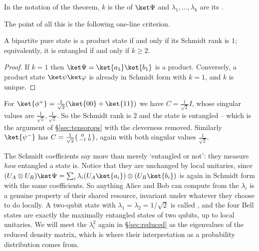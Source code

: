 \begin{definition}
	In the notation of the theorem, $k$ is the  of $\ket\Psi$ and $\lambda_1,\dots,\lambda_k$ are its .
\end{definition}

The point of all this is the following one-line criterion.

\begin{corollary}
	A bipartite pure state is a product state if and only if its Schmidt rank is $1$; equivalently, it is entangled if and only if $k\geq2$.
\end{corollary}

\begin{proof}
	If $k=1$ then $\ket\Psi = \ket{a_1}\ket{b_1}$ is a product. Conversely, a product state $\ket\psi\ket\varphi$ is already in Schmidt form with $k = 1$, and $k$ is unique.
\end{proof}

\begin{example}
	For $\ket{\phi^+} = \tfrac1{\sqrt2}(\ket{00}+\ket{11})$ we have $C = \tfrac1{\sqrt2}I$, whose singular values are $\tfrac1{\sqrt2},\tfrac1{\sqrt2}$. So the Schmidt rank is $2$ and the state is entangled -- which is the argument of \S\ref{sec:tensorops} with the cleverness removed. Similarly $\ket{\psi^-}$ has $C = \tfrac1{\sqrt2}\begin{psmallmatrix}0&1\\-1&0\end{psmallmatrix}$, again with both singular values $\tfrac1{\sqrt2}$.
\end{example}

The Schmidt coefficients say more than merely `entangled or not': they measure \emph{how} entangled a state is. Notice that they are unchanged by local unitaries, since $(U_A\otimes U_B)\ket\Psi = \sum_i\lambda_i(U_A\ket{a_i})\otimes(U_B\ket{b_i})$ is again in Schmidt form with the same coefficients. So anything Alice and Bob can compute from the $\lambda_i$ is a genuine property of their shared resource, invariant under whatever they choose to do locally. A two-qubit state with $\lambda_1 = \lambda_2 = 1/\sqrt2$ is called , and the four Bell states are exactly the maximally entangled states of two qubits, up to local unitaries. We will meet the $\lambda_i^2$ again in \S\ref{sec:reduced} as the eigenvalues of the reduced density matrix, which is where their interpretation as a probability distribution comes from.

